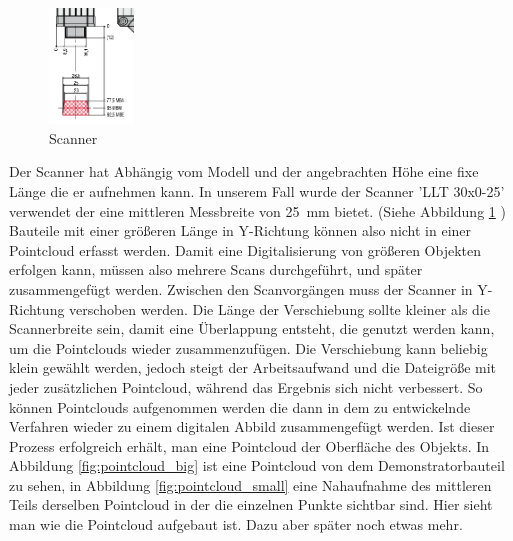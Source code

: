 \documentclass[../main.tex]{subfiles}
\begin{document}
\begin{figure}
    \includegraphics[width=0.2\textwidth]{images/Scanner.PNG}
    \caption{Scanner}
    \label{fig:scanner}
\end{figure}

Der Scanner hat Abhängig vom Modell und der angebrachten Höhe eine fixe Länge die 
er aufnehmen kann. In unserem Fall wurde der Scanner 'LLT 30x0-25' verwendet der 
eine mittleren Messbreite von 25 mm bietet. 
(Siehe Abbildung \ref{fig:scanner} \cite{MESSTECHNIK_2020}) 
Bauteile mit einer größeren Länge in Y-Richtung können also nicht in einer Pointcloud
erfasst werden. Damit eine Digitalisierung von größeren Objekten erfolgen kann, müssen
also mehrere Scans durchgeführt, und später zusammengefügt werden. Zwischen den 
Scanvorgängen muss der Scanner in Y-Richtung verschoben werden.
Die Länge der Verschiebung sollte 
kleiner als die Scannerbreite sein, damit eine Überlappung entsteht, die 
genutzt werden kann, um die Pointclouds wieder zusammenzufügen. Die Verschiebung kann 
beliebig klein gewählt werden, jedoch steigt der Arbeitsaufwand und die Dateigröße mit 
jeder zusätzlichen Pointcloud, während das Ergebnis sich nicht verbessert.
So können Pointclouds aufgenommen werden die dann in dem zu entwickelnde Verfahren
wieder zu einem digitalen Abbild zusammengefügt werden. Ist dieser Prozess erfolgreich
erhält, man eine Pointcloud der Oberfläche des Objekts. 
In Abbildung \ref{fig:pointcloud_big} ist eine Pointcloud von dem Demonstratorbauteil
zu sehen, in Abbildung \ref{fig:pointcloud_small} eine Nahaufnahme des mittleren Teils
derselben Pointcloud in der die einzelnen Punkte sichtbar sind. Hier sieht man wie
die Pointcloud aufgebaut ist. Dazu aber später noch etwas mehr.
\end{document}
